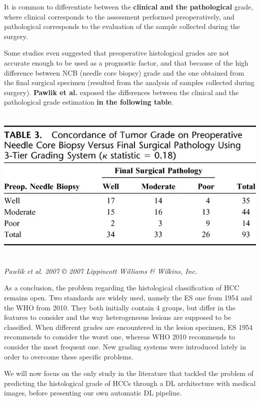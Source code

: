 \documentclass[]{article}
\begin{document}
It is common to differentiate between the \textbf{clinical and the
pathological} grade, where clinical corresponds to the assessment
performed preoperatively, and pathological corresponds to the evaluation
of the sample collected during the surgery.

Some studies even suggested that preoperative histological grades are
not accurate enough to be used as a prognostic factor, and that because
of the high difference between NCB (needle core biopsy) grade and the
one obtained from the final surgical specimen (resulted from the
analysis of samples collected during surgery). \textbf{Pawlik et al.}
exposed the differences between the clinical and the pathological grade
estimation \textbf{in the following table}.

\includegraphics[width=6.26772in,height=2.97222in]{./images/media/image3.jpg}

\emph{Pawlik et al. 2007 © 2007 Lippincott Williams \& Wilkins, Inc.}

As a conclusion, the problem regarding the histological classification
of HCC remains open. Two standards are widely used, namely the ES one
from 1954 and the WHO from 2010. They both initially contain 4 groups,
but differ in the features to consider and the way heterogeneous lesions
are supposed to be classified. When different grades are encountered in
the lesion specimen, ES 1954 recommends to consider the worst one,
whereas WHO 2010 recommends to consider the most frequent one. New
grading systems were introduced lately in order to overcome these
specific problems.

We will now focus on the only study in the literature that tackled the
problem of predicting the histological grade of HCCs through a DL
architecture with medical images, before presenting our own automatic DL
pipeline.
\end{document}
